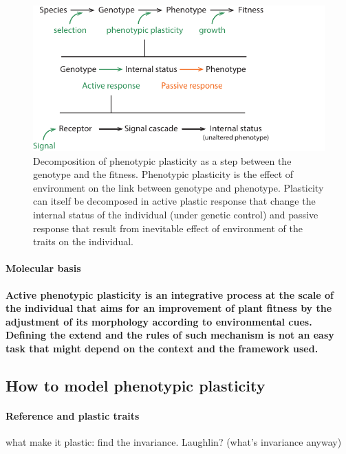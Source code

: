 \begin{figure}
    \includegraphics[width=1\linewidth]{./2_PP/Figures/Concepts/genotype_to_phenotype.pdf}
  \caption[Decomposition of plastic response]{Decomposition of phenotypic plasticity as a step between the genotype and the fitness. Phenotypic plasticity is the effect of environment on the link between genotype and phenotype. Plasticity can itself be decomposed in active plastic response that change the internal status of the individual (under genetic control) and passive response that result from inevitable effect of environment of the traits on the individual.}
  \label{fg:PCA_calibration}
\end{figure}

\paragraph{Molecular basis}

\textbf{Active phenotypic plasticity is an integrative process at the scale of the individual that aims for an improvement of plant fitness by the adjustment of its morphology according to environmental cues. Defining the extend and the rules of such mechanism is not an easy task that might depend on the context and the framework used.}

\subsection{How to model phenotypic plasticity}

\paragraph{Reference and plastic traits}

what make it plastic: find the invariance. Laughlin? (what's invariance anyway)

